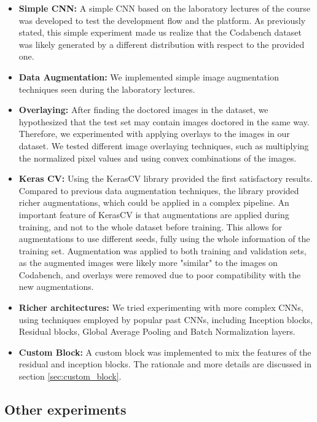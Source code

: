 \documentclass[11pt]{article}
\begin{document}
\begin{multicols}{2}
      \begin{itemize}
            \item \textbf{Simple CNN:} A simple CNN based on the laboratory lectures of the course was developed to test the development flow and the platform. As previously stated, this simple experiment made us realize that the Codabench dataset was likely generated by a different distribution with respect to the provided one.
            \item \textbf{Data Augmentation:} We implemented simple image augmentation techniques seen during the laboratory lectures.
            \item \textbf{Overlaying:} After finding the doctored images in the dataset, we hypothesized that the test set may contain images doctored in the same way. Therefore, we experimented with applying overlays to the images in our dataset. We tested different image overlaying techniques, such as multiplying the 
            normalized pixel values and using convex combinations of the images.
            \item \textbf{Keras CV:} Using the KerasCV library\cite{chollet2015keras} provided the first satisfactory results. Compared to previous data augmentation techniques, the library provided richer augmentations, which could be applied in a complex pipeline. An important feature of KerasCV is that augmentations are applied during training, and not to the whole dataset before training. This allows for augmentations to use different seeds, fully using the whole information of the training set. Augmentation was applied to both training and validation sets, as the augmented images were likely more "similar" to the images on Codabench, and overlays were removed due to poor compatibility with the new augmentations.
            \item \textbf{Richer architectures:} We tried experimenting with more complex CNNs, using techniques employed by popular past CNNs, including Inception blocks\cite{Inception}, Residual blocks\cite{He2015DeepRL}, Global Average Pooling\cite{Lin2013NetworkIN} and Batch Normalization layers\cite{pmlr-v37-ioffe15}.
            \item \textbf{Custom Block:} A custom block was implemented to mix the features of the residual and inception blocks. The rationale and more details are discussed in section \ref{sec:custom_block}.
      \end{itemize}

      \subsection{Other experiments}


\end{multicols}
\end{document}
